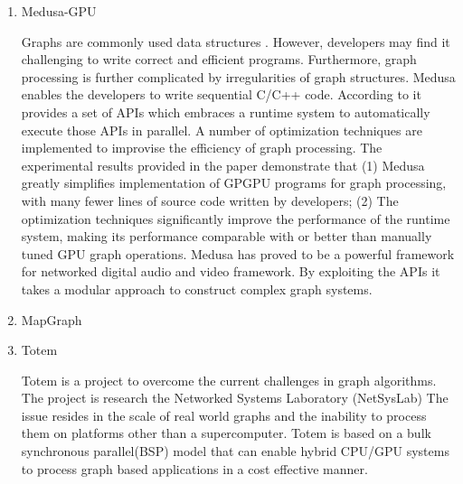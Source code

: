 \begin{enumerate}
\item {} 
Medusa-GPU

Graphs are commonly used data structures . However, developers
may find it challenging to write correct and efficient
programs. Furthermore, graph processing is further complicated by
irregularities of graph structures. Medusa enables the developers
to write sequential C/C++ code. According to \label{\detokenize{i524/technologies:id300}}{\hyperref[\detokenize{i524/technologies:paper-medusa}]{\sphinxcrossref{{[}254{]}}}}
it provides a set of APIs which embraces a runtime system to
automatically execute those APIs in parallel. A number of
optimization techniques are implemented to improvise the
efficiency of graph processing. The experimental results provided
in the paper \label{\detokenize{i524/technologies:id301}}{\hyperref[\detokenize{i524/technologies:paper-medusa}]{\sphinxcrossref{{[}254{]}}}} demonstrate that (1) Medusa
greatly simplifies implementation of GPGPU programs for graph
processing, with many fewer lines of source code written by
developers; (2) The optimization techniques significantly improve
the performance of the runtime system, making its performance
comparable with or better than manually tuned GPU graph
operations. \label{\detokenize{i524/technologies:id302}}{\hyperref[\detokenize{i524/technologies:www-medusa}]{\sphinxcrossref{{[}255{]}}}} Medusa has proved to be a powerful
framework for networked digital audio and video
framework. \label{\detokenize{i524/technologies:id303}}{\hyperref[\detokenize{i524/technologies:www-medusa}]{\sphinxcrossref{{[}255{]}}}} By exploiting the APIs it takes a
modular approach to construct complex graph systems.

\item {} 
MapGraph

\item {} 
Totem

Totem is a project to overcome the current challenges in graph
algorithms.  The project is research the Networked Systems
Laboratory (NetSysLab) The issue resides in the scale of real
world graphs and the inability to process them on platforms
other than a supercomputer.  Totem is based on a bulk synchronous
parallel(BSP) model that can enable hybrid CPU/GPU systems to process
graph based applications in a cost effective manner.
\label{\detokenize{i524/technologies:id304}}{\hyperref[\detokenize{i524/technologies:www-netsyslab}]{\sphinxcrossref{{[}256{]}}}}

\end{enumerate}


